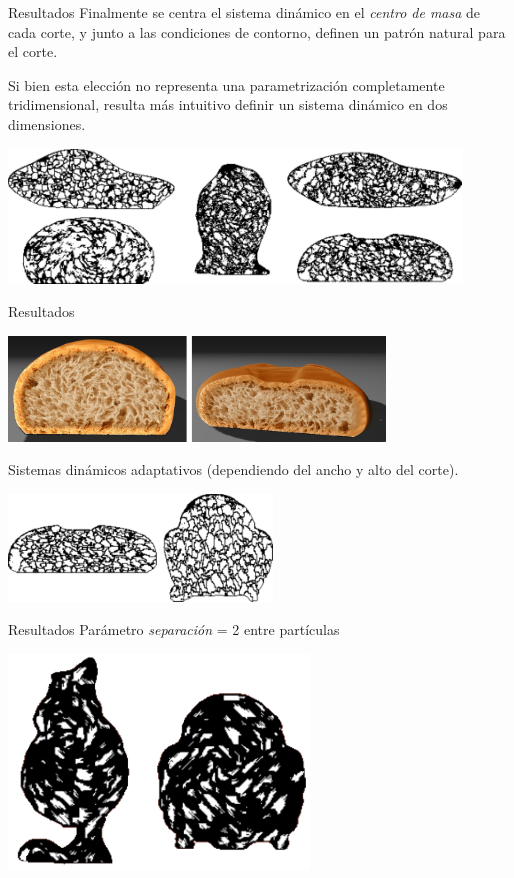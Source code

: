 \documentclass[spanish]{beamer}
\begin{document}
\begin{frame}{Resultados}
Finalmente se centra el sistema dinámico en el {\em centro de masa} de cada corte, y junto a las condiciones de contorno, definen un patrón natural para el corte.

Si bien esta elección no representa una parametrización completamente tridimensional, resulta más intuitivo definir un sistema dinámico en dos dimensiones.

\includegraphics[width=12cm]{../figures/Fig5}
\end{frame}

\begin{frame}{Resultados}
\centerline{\includegraphics[width=10cm]{../figures/Fig11CAVW}}


Sistemas dinámicos adaptativos (dependiendo del ancho y alto del corte).

\centerline{\includegraphics[width=7cm]{../figures/Fig6}}

\end{frame}

\begin{frame}{Resultados}
Parámetro {\em separación} = 2 entre partículas

\centerline{\includegraphics[width=8cm]{../figures/Fig7}}
\end{frame}
\end{document}

